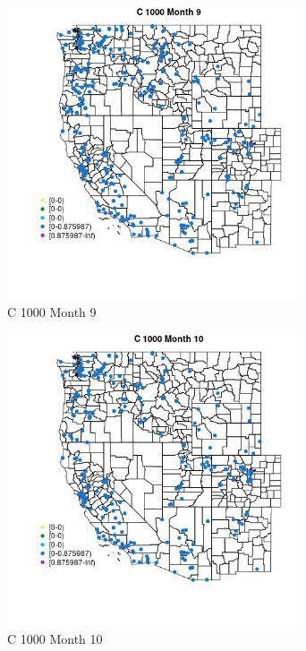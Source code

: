 \begin{figure} 
\centering  
\includegraphics[width=0.77\textwidth]{Code_Outputs/Report_ML_input_PM25_Step4_part_e_de_duplicated_aveswNAs_MapObsMo9C_1000.jpg} 
\caption{\label{fig:Report_ML_input_PM25_Step4_part_e_de_duplicated_aveswNAsMapObsMo9C_1000}C 1000 Month 9} 
\end{figure} 
 

\begin{figure} 
\centering  
\includegraphics[width=0.77\textwidth]{Code_Outputs/Report_ML_input_PM25_Step4_part_e_de_duplicated_aveswNAs_MapObsMo10C_1000.jpg} 
\caption{\label{fig:Report_ML_input_PM25_Step4_part_e_de_duplicated_aveswNAsMapObsMo10C_1000}C 1000 Month 10} 
\end{figure} 
 

